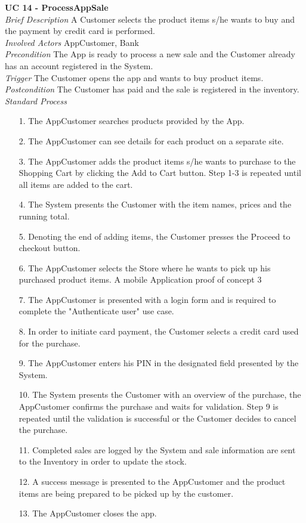 \textbf{UC 14 - ProcessAppSale}\\
\textit{Brief Description} A Customer selects the product items s/he wants to buy and the payment by credit card is performed.\\ \newline
\textit{Involved Actors} AppCustomer, Bank\\ \newline
\textit{Precondition} The App is ready to process a new sale and the Customer already has an account registered in the System.\\ \newline
\textit{Trigger} The Customer opens the app and wants to buy product items.\\ \newline
\textit{Postcondition} The Customer has paid and the sale is registered in the inventory.\\ \newline
\textit{Standard Process}
\begin{itemize}[leftmargin=*]
	\item[1.] The AppCustomer searches products provided by the App.
	\item[2.] The AppCustomer can see details for each product on a separate site.
	\item[3.] The AppCustomer adds the product items s/he wants to purchase to the Shopping Cart by clicking the Add to Cart button. Step 1-3 is repeated until all items are added to the cart.
	\item[4.] The System presents the Customer with the item names, prices and the running total.
	\item[5.] Denoting the end of adding items, the Customer presses the Proceed to checkout button.
	\item[6.] The AppCustomer selects the Store where he wants to pick up his	purchased product items. A mobile Application proof of concept 3
	\item[7.] The AppCustomer is presented with a login form and is required to complete the "Authenticate user" use case.
	\item[8.] In order to initiate card payment, the Customer selects a credit card used
	for the purchase.
	\item[9.] The AppCustomer enters his PIN in the designated field presented by the System.
	\item[10.] The System presents the Customer with an overview of the purchase, the AppCustomer confirms the purchase and waits for validation. Step 9 is repeated until the validation is successful or the Customer decides to cancel the purchase.
	\item[11.] Completed sales are logged by the System and sale information are sent to	the Inventory in order to update the stock.
	\item[12.] A success message is presented to the AppCustomer and the product items
	are being prepared to be picked up by the customer.
	\item[13.] The AppCustomer closes the app.
\end{itemize}

